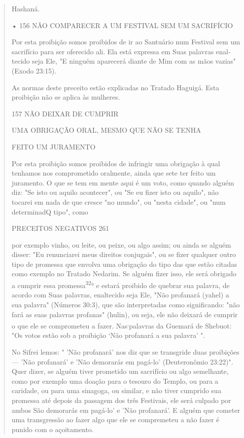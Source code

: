 \begin{quote}
Hashaná.

• 156 NÃO COMPARECER A UM FESTIVAL SEM UM SACRIFÍCIO

Por esta proibição somos proibidos de ir ao Santuário num Festival sem
um sacrifício para ser oferecido ali. Ela está expressa em Suas palavras
enal­tecido seja Ele, "E ninguém aparecerá diante de Mim com as mãos
vazias" (Exodo 23:15).

As normas deste preceito estão explicadas no Tratado Haguigá. Esta
proibição não se aplica às mulheres.

157 NÃO DEIXAR DE CUMPRIR

UMA OBRIGAÇÃO ORAL, MESMO QUE NÃO SE TENHA

FEITO UM JURAMENTO

Por esta proibição somos proibidos de infringir uma obrigação à qual
tenhamos nos comprometido oralmente, ainda que sete ter feito um
juramen­to. O que se tem em mente aqui é um voto, como quando alguém
diz: "Se isto ou aquilo acontecer", ou "Se eu fizer isto ou aquilo", não
tocarei em nada de que cresce "no mundo", ou "nesta cidade", ou "num
determinadQ tipo", como

PRECEITOS NEGATIVOS 261

por exemplo vinho, ou leite, ou peixe, ou algo assim; ou ainda se alguém
dis­ser: "Eu renunciarei meus direitos conjugais", ou se fizer qualquer
outro tipo de promessa que envolva uma obrigação do tipo das que estão
citadas como exemplo no Tratado Nedarim. Se alguém fizer isso, ele será
obrigado a cumprir essa promessa\textsuperscript{32}° e estará proibido
de quebrar sua palavra, de acordo com Suas palavras, enaltecido seja
Ele, "Não profanará (yahel) a sua palavra" (Números 30:3), que são
interpretadas como significando: "não fará as suas palavras pro­fanas"
(hulin), ou seja, ele não deixará de cumprir o que ele se comprometeu a
fazer. Nas\textsuperscript{.}palavras da Guemará de Shebuot: "Os votos
estão sob a proibição `Não profanará a sua palavra' ".

No Sifrei lemos: " 'Não profanará' nos diz que se transgride duas
proi­bições --- 'Não profanará' e 'Não demorarás em pagá-lo'
(Deuteronômio 23:22)". Quer dizer, se alguém tiver prometido um
sacrifício ou algo semelhante, como por exemplo uma doação para o
tesouro do Templo, ou para a caridade, ou para uma sinagoga, ou similar,
e não tiver cumprido sua promessa até depois da passagem dos três
Festivais, ele será culpado por ambos São demorarás em pagá-lo' e 'Não
profanará'. E alguém que cometer uma transgressão ao fazer al­go que ele
se compremeteu a não fazer é punido com o açoitamento.
\end{quote}

